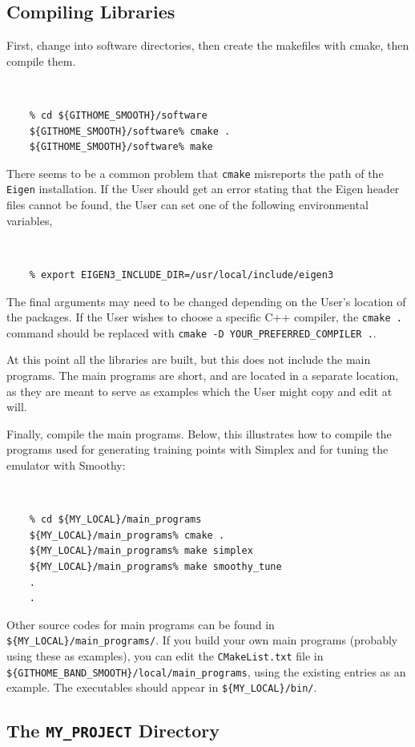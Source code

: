 \documentclass[UserManual.tex]{subfiles}
\begin{document}
\subsection{Compiling Libraries }

First, change into software directories, then create the makefiles with cmake, then compile them.
{\tt 
\begin{verbatim}
    % cd ${GITHOME_SMOOTH}/software
    ${GITHOME_SMOOTH}/software% cmake .
    ${GITHOME_SMOOTH}/software% make
\end{verbatim}
}
There seems to be a common problem that {\tt cmake} misreports the path of the {\tt Eigen} installation. If the User should get an error stating that the Eigen header files cannot be found, the User can set one of the following environmental variables,
{\tt 
\begin{verbatim}
    % export EIGEN3_INCLUDE_DIR=/usr/local/include/eigen3
\end{verbatim}
}
The final arguments may need to be changed depending on the User's location of the packages. If the User wishes to choose a specific C++ compiler, the {\tt cmake .} command should be replaced with {\tt cmake -D YOUR\_PREFERRED\_COMPILER .}. 

At this point all the libraries are built, but this does not include the main programs. The main programs are short, and are located in a separate location, as they are meant to serve as examples which the User might copy and edit at will.

Finally, compile the main programs. Below, this illustrates how to compile the programs used for generating training points with Simplex and for tuning the emulator with Smoothy:
{\tt
\begin{verbatim}
    % cd ${MY_LOCAL}/main_programs
    ${MY_LOCAL}/main_programs% cmake .
    ${MY_LOCAL}/main_programs% make simplex
    ${MY_LOCAL}/main_programs% make smoothy_tune
    .
    .
\end{verbatim}
}
Other source codes for main programs can be found in {\tt \$\{MY\_LOCAL\}/main\_programs/}. If you build your own main programs (probably using these as examples), you can edit the {\tt CMakeList.txt} file in {\tt \$\{GITHOME\_BAND\_SMOOTH\}/local/main\_programs}, using the existing entries as an example. The executables should appear in {\tt \$\{MY\_LOCAL\}/bin/}. 

\subsection{The {\tt MY\_PROJECT} Directory}
\end{document}
